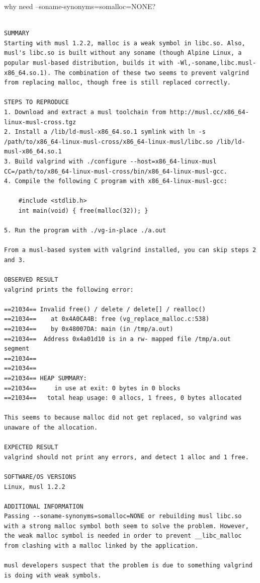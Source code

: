 \documentclass[paper=8.5in:11in, twoside, 12pt, pagesize=pdftex]{book}
\begin{document}
why need --soname-synonyms=somalloc=NONE? 

\begin{verbatim}

SUMMARY
Starting with musl 1.2.2, malloc is a weak symbol in libc.so. Also, musl's libc.so is built without any soname (though Alpine Linux, a popular musl-based distribution, builds it with -Wl,-soname,libc.musl-x86_64.so.1). The combination of these two seems to prevent valgrind from replacing malloc, though free is still replaced correctly.

STEPS TO REPRODUCE
1. Download and extract a musl toolchain from http://musl.cc/x86_64-linux-musl-cross.tgz
2. Install a /lib/ld-musl-x86_64.so.1 symlink with ln -s /path/to/x86_64-linux-musl-cross/x86_64-linux-musl/libc.so /lib/ld-musl-x86_64.so.1
3. Build valgrind with ./configure --host=x86_64-linux-musl CC=/path/to/x86_64-linux-musl-cross/bin/x86_64-linux-musl-gcc.
4. Compile the following C program with x86_64-linux-musl-gcc:

	#include <stdlib.h>
	int main(void) { free(malloc(32)); }

5. Run the program with ./vg-in-place ./a.out

From a musl-based system with valgrind installed, you can skip steps 2 and 3.

OBSERVED RESULT
valgrind prints the following error:

==21034== Invalid free() / delete / delete[] / realloc()
==21034==    at 0x4A0CA4B: free (vg_replace_malloc.c:538)
==21034==    by 0x48007DA: main (in /tmp/a.out)
==21034==  Address 0x4a01d10 is in a rw- mapped file /tmp/a.out segment
==21034==
==21034==
==21034== HEAP SUMMARY:
==21034==     in use at exit: 0 bytes in 0 blocks
==21034==   total heap usage: 0 allocs, 1 frees, 0 bytes allocated

This seems to because malloc did not get replaced, so valgrind was unaware of the allocation.

EXPECTED RESULT
valgrind should not print any errors, and detect 1 alloc and 1 free.

SOFTWARE/OS VERSIONS
Linux, musl 1.2.2

ADDITIONAL INFORMATION
Passing --soname-synonyms=somalloc=NONE or rebuilding musl libc.so with a strong malloc symbol both seem to solve the problem. However, the weak malloc symbol is needed in order to prevent __libc_malloc from clashing with a malloc linked by the application.

musl developers suspect that the problem is due to something valgrind is doing with weak symbols.
\end{verbatim}
\end{document}
